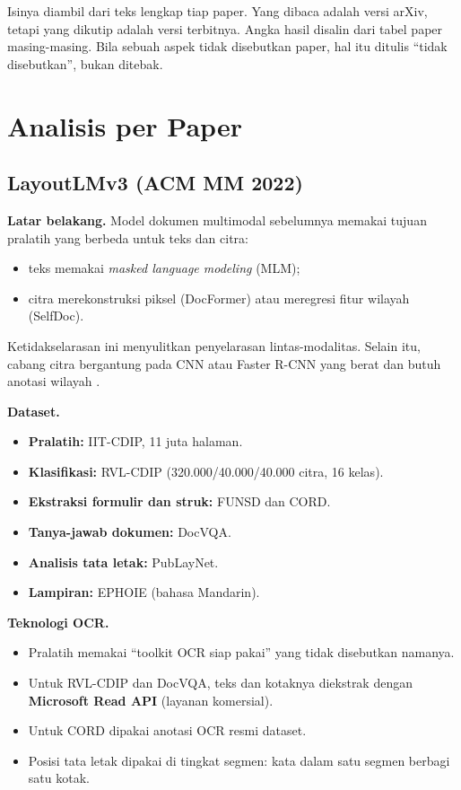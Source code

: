 Isinya diambil dari teks lengkap tiap paper. Yang dibaca adalah versi arXiv, tetapi yang
dikutip adalah versi terbitnya. Angka hasil disalin dari tabel paper masing-masing. Bila
sebuah aspek tidak disebutkan paper, hal itu ditulis \enquote{tidak disebutkan}, bukan
ditebak.

\section{Analisis per Paper}\label{sec:analisis}

\subsection{LayoutLMv3 (ACM MM 2022)}\label{sec:layoutlmv3}

\textbf{Latar belakang.} Model dokumen multimodal sebelumnya memakai tujuan pralatih yang
berbeda untuk teks dan citra:
\begin{itemize}
  \item teks memakai \textit{masked language modeling} (MLM);
  \item citra merekonstruksi piksel (DocFormer) atau meregresi fitur wilayah (SelfDoc).
\end{itemize}
Ketidakselarasan ini menyulitkan penyelarasan lintas-modalitas. Selain itu, cabang citra
bergantung pada CNN atau Faster R-CNN yang berat dan butuh anotasi wilayah
\parencite{huang2022layoutlmv3}.

\textbf{Dataset.}
\begin{itemize}
  \item \textbf{Pralatih:} IIT-CDIP, 11 juta halaman.
  \item \textbf{Klasifikasi:} RVL-CDIP (320.000/40.000/40.000 citra, 16 kelas).
  \item \textbf{Ekstraksi formulir dan struk:} FUNSD dan CORD.
  \item \textbf{Tanya-jawab dokumen:} DocVQA.
  \item \textbf{Analisis tata letak:} PubLayNet.
  \item \textbf{Lampiran:} EPHOIE (bahasa Mandarin).
\end{itemize}

\textbf{Teknologi OCR.}
\begin{itemize}
  \item Pralatih memakai \enquote{toolkit OCR siap pakai} yang tidak disebutkan namanya.
  \item Untuk RVL-CDIP dan DocVQA, teks dan kotaknya diekstrak dengan \textbf{Microsoft Read
  API} (layanan komersial).
  \item Untuk CORD dipakai anotasi OCR resmi dataset.
  \item Posisi tata letak dipakai di tingkat segmen: kata dalam satu segmen berbagi satu
  kotak.
\end{itemize}

